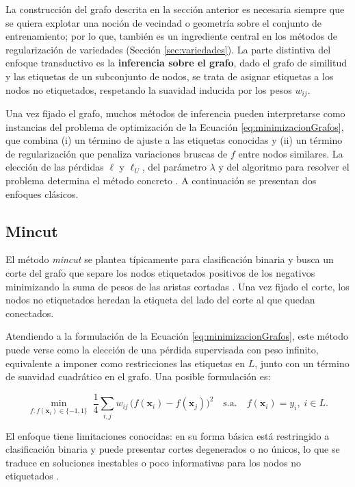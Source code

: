 La construcción del grafo descrita en la sección anterior es necesaria siempre que se quiera explotar una noción de vecindad o geometría sobre el conjunto de entrenamiento; por lo que, también es un ingrediente central en los métodos de regularización de variedades (Sección \ref{sec:variedades}). La parte distintiva del enfoque transductivo es la \textbf{inferencia sobre el grafo}, dado el grafo de similitud y las etiquetas de un subconjunto de nodos, se trata de asignar etiquetas a los nodos no etiquetados, respetando la suavidad inducida por los pesos $w_{ij}$.

Una vez fijado el grafo, muchos métodos de inferencia pueden interpretarse como instancias del problema de optimización de la Ecuación \ref{eq:minimizacionGrafos}, que combina (i) un término de ajuste a las etiquetas conocidas y (ii) un término de regularización que penaliza variaciones bruscas de $f$ entre nodos similares. La elección de las pérdidas $\ell$ y $\ell_U$, del parámetro $\lambda$ y del algoritmo para resolver el problema determina el método concreto \cite{van2020survey}. A continuación se presentan dos enfoques clásicos.

\subsection{Mincut}

El método \textit{mincut} se plantea típicamente para clasificación binaria y busca un corte del grafo que separe los nodos etiquetados positivos de los negativos minimizando la suma de pesos de las aristas cortadas \cite{zhu2009introduction}. Una vez fijado el corte, los nodos no etiquetados heredan la etiqueta del lado del corte al que quedan conectados.

Atendiendo a la formulación de la Ecuación \ref{eq:minimizacionGrafos}, este método puede verse como la elección de una pérdida supervisada con peso infinito, equivalente a imponer como restricciones las etiquetas en $L$, junto con un término de suavidad cuadrático en el grafo. Una posible formulación es:

\begin{equation}
    \min_{f: f(\mathbf{x}_i)\in\{-1,1\}} \; \frac{1}{4} \sum_{i,j} w_{ij}\, \bigl(f(\mathbf{x}_i) - f(\mathbf{x}_j)\bigr)^2
    \quad \text{s.a.}\quad f(\mathbf{x}_i)=y_i,\; i\in L.
\end{equation}

El enfoque tiene limitaciones conocidas: en su forma básica está restringido a clasificación binaria y puede presentar cortes degenerados o no únicos, lo que se traduce en soluciones inestables o poco informativas para los nodos no etiquetados \cite{zhu2009introduction,van2020survey}.

